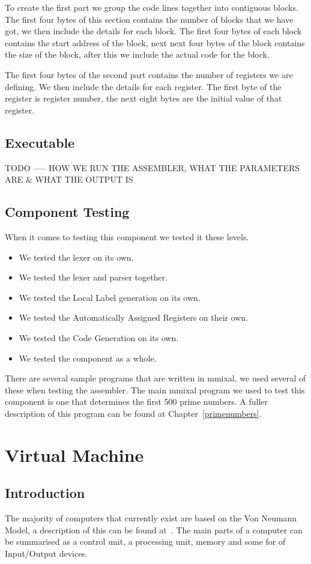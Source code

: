 \documentclass[a4paper,11pt]{report}
\begin{document}
To create the first part we group the code lines together into contiguous blocks. The first four bytes of this section contains the number of blocks that we have got, we then include the details for each block. The first four bytes of each block contains the start address of the block, next next four bytes of the block contains the size of the block, after this we include the actual code for the block.

The first four bytes of the second part contains the number of registers we are defining. We then include the details for each register. The first byte of the register is register number, the next eight bytes are the initial value of that register.

\section{Executable}
TODO ----- HOW WE RUN THE ASSEMBLER, WHAT THE PARAMETERS ARE \& WHAT THE OUTPUT IS
\section{Component Testing}
When it comes to testing this component we tested it these levels.
\begin{itemize}
\item We tested the lexer on its own.
\item We tested the lexer and parser together.
\item We tested the Local Label generation on its own.
\item We tested the Automatically Assigned Registers on their own.
\item We tested the Code Generation on its own.
\item We tested the component as a whole.
\end{itemize}

There are several sample programs that are written in mmixal, we used several of these when testing the assembler. The main mmixal program we used to test this component is one that determines the first 500 prime numbers. A fuller description of this program can be found at Chapter~\ref{primenumbers}.
\chapter{Virtual Machine}\label{VM}
\section{Introduction}
The majority of computers that currently exist are based on the Von Neumann Model, a description of this can be found at~\cite{vnmodel}. The main parts of a computer can be summarised as a control unit, a processing unit, memory and some for of Input/Output devices.
\end{document}

